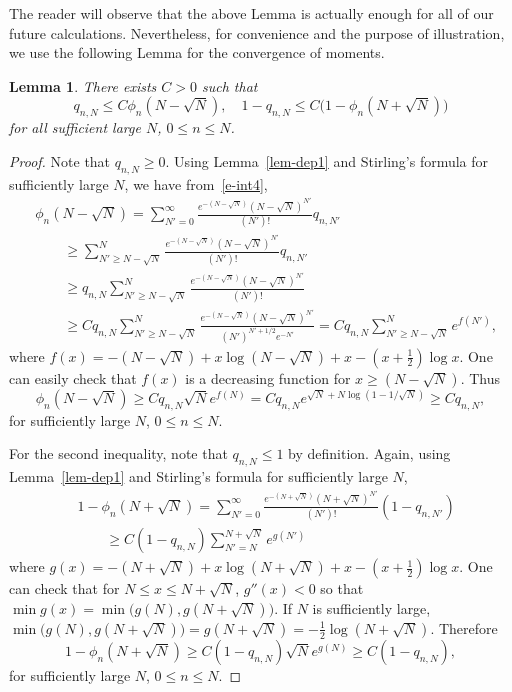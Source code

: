 \documentclass{amsart}
\newtheorem{lem}[thm]{Lemma}
\theoremstyle{definition}
\theoremstyle{remark}
\numberwithin{equation}{section}
\begin{document}
The reader will observe that the above Lemma is actually 
enough for all of our future calculations.  
Nevertheless, for convenience and the purpose of illustration, 
we use the following Lemma for the convergence of moments.
\begin{lem}\label{lem-dep3}
   There exists $C>0$ such that 
\begin{equation*}
    q_{n,N} \le C\phi_n(N-\sqrt{N}),\quad
1-q_{n,N} \le C\bigl(1-\phi_n(N+\sqrt{N})\bigr)
\end{equation*}
for all sufficient large $N$, $0\le n\le N$.
\end{lem}
\begin{proof}
   Note that $q_{n,N} \geq 0$. Using Lemma~\ref{lem-dep1} and 
Stirling's formula for sufficiently large $N$, we have from~\eqref{e-int4}, 
\begin{equation*}
  \begin{split}
   &\phi_n(N-\sqrt{N})
= \sum_{N'=0}^{\infty} \frac{e^{-(N-\sqrt{N})}(N-\sqrt{N})^{N'}}{(N')!} q_{n,N'}\\
   &\qquad \geq \sum_{N'\geq N-\sqrt{N}}^{N} 
\frac{e^{-(N-\sqrt{N})}(N-\sqrt{N})^{N'}}{(N')!} q_{n,N'}\\
   &\qquad \geq q_{n,N}\sum_{N'\geq N-\sqrt{N}}^{N} 
\frac{e^{-(N-\sqrt{N})}(N-\sqrt{N})^{N'}}{(N')!}\\
   &\qquad \geq C q_{n,N} \sum_{N'\geq N-\sqrt{N}}^{N} 
\frac{e^{-(N-\sqrt{N})}(N-\sqrt{N})^{N'}}{(N')^{N'+1/2}e^{-N'}}
   = C q_{n,N} \sum_{N'\geq N-\sqrt{N}}^{N} e^{f(N')}, 
  \end{split}
\end{equation*}
where $f(x)=-(N-\sqrt{N})+x\log (N-\sqrt{N}) +x-(x+\frac12)\log x$.
One can easily check that $f(x)$ is a decreasing function 
for $x\geq (N-\sqrt{N})$. Thus 
\begin{equation*}
   \phi_n(N-\sqrt{N})\geq Cq_{n,N} \sqrt{N} e^{f(N)}
=Cq_{n,N} e^{\sqrt{N}+N\log (1-1/\sqrt{N})} \geq Cq_{n,N},
\end{equation*}
for sufficiently large $N$, $0\le n\le N$.

 For the second inequality, note that $q_{n,N} \le 1$ by definition.
 Again, using Lemma~\ref{lem-dep1} and
Stirling's formula for sufficiently large $N$,
\begin{equation*}
  \begin{split}
   &1-\phi_n(N+\sqrt{N})
= \sum_{N'=0}^{\infty} \frac{e^{-(N+\sqrt{N})}(N+\sqrt{N})^{N'}}{(N')!} 
(1-q_{n,N'})\\
   &\qquad \geq C (1-q_{n,N}) \sum_{N'=N}^{N+\sqrt{N}} e^{g(N')}
  \end{split}
\end{equation*}
where $g(x)=-(N+\sqrt{N})+x\log (N+\sqrt{N}) +x-(x+\frac12)\log x$.
One can check that for $N\le x\le N+\sqrt{N}$, 
$g''(x)<0$ so that $\min g(x)=\min \bigl(g(N), g(N+\sqrt{N})\bigr)$.
If $N$ is sufficiently large, $\min \bigl(g(N), g(N+\sqrt{N})\bigr)
=g(N+\sqrt{N})=-\frac12 \log(N+\sqrt{N})$. 
Therefore 
\begin{equation*}
   1-\phi_n(N+\sqrt{N})\geq C(1-q_{n,N}) \sqrt{N} e^{g(N)}
\geq C(1-q_{n,N}),
\end{equation*}
for sufficiently large $N$, $0\le n\le N$.
\end{proof}
\end{document}
